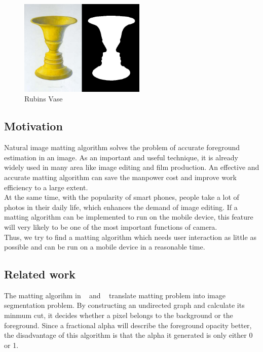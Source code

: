 \documentclass[11pt,letterpaper]{article}
\begin{document}
\begin{figure}[h]
  \begin{center}
    \includegraphics[width=6cm]{rubins_vase.jpg} 
    \caption{Rubins Vase}
  \end{center}
\end{figure}

\subsection{Motivation}
Natural image matting algorithm solves the problem of accurate foreground estimation in an image. As an important and useful technique, it is already widely used in many area like image editing and film production. An effective and accurate matting algorithm can save the manpower cost and improve work efficiency to a large extent. \\

At the same time, with the popularity of smart phones, people take a lot of photos in their daily life, which enhances the demand of image editing. If a matting algorithm can be implemented to run on the mobile device, this feature will very likely to be one of the most important functions of camera.\\ 

Thus, we try to find a matting algorithm which needs user interaction as little as possible and can be run on a mobile device in a reasonable time. \\

\subsection{Related work}
The matting algorihm in ~\cite{Boykov:2001} and ~\cite{Li:2004} translate matting problem into image segmentation problem. By constructing an undirected graph and calculate its minmum cut, it decides whether a pixel belongs to the background or the foreground. Since a fractional alpha will describe the foreground opacity better, the disadvantage of this algorithm is that the alpha it generated is only either 0 or 1. \\
\end{document}
